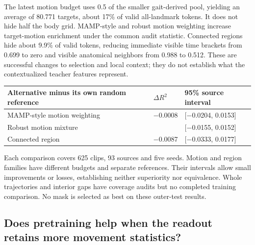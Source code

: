 \documentclass{article}
\begin{document}
The latest motion budget uses 0.5 of the smaller gait-derived pool, yielding an average of 80.771 targets, about 17\% of valid all-landmark tokens. It does not hide half the body grid. MAMP-style and robust motion weighting increase target-motion enrichment under the common audit statistic. Connected regions hide about 9.9\% of valid tokens, reducing immediate visible time brackets from 0.699 to zero and visible anatomical neighbors from 0.988 to 0.512. These are successful changes to selection and local context; they do not establish what the contextualized teacher features represent.

\begin{table}[htbp]
\centering
\small
\begin{tabular}{@{}
  >{\raggedright\arraybackslash}p{}
  >{\raggedleft\arraybackslash}p{}
  >{\raggedright\arraybackslash}p{}@{}}
\toprule\noalign{}
\begin{minipage}[b]{\linewidth}\raggedright
Alternative minus its own random reference
\end{minipage} & \begin{minipage}[b]{\linewidth}\raggedleft
\(\Delta R^2\)
\end{minipage} & \begin{minipage}[b]{\linewidth}\raggedright
95\% source interval
\end{minipage} \\
\midrule\noalign{}

MAMP-style motion weighting & −0.0008 & {[}−0.0204, 0.0153{]} \\
Robust motion mixture & 0.0005 & {[}−0.0155, 0.0152{]} \\
Connected region & −0.0087 & {[}−0.0333, 0.0177{]} \\
\bottomrule
\end{tabular}
\end{table}

Each comparison covers 625 clips, 93 sources and five seeds. Motion and region families have different budgets and separate references. Their intervals allow small improvements or losses, establishing neither superiority nor equivalence. Whole trajectories and interior gaps have coverage audits but no completed training comparison. No mask is selected as best on these outer-test results.

\subsection{Does pretraining help when the readout retains more movement statistics?}\label{does-pretraining-help-when-the-readout-retains-more-movement-statistics}
\end{document}

